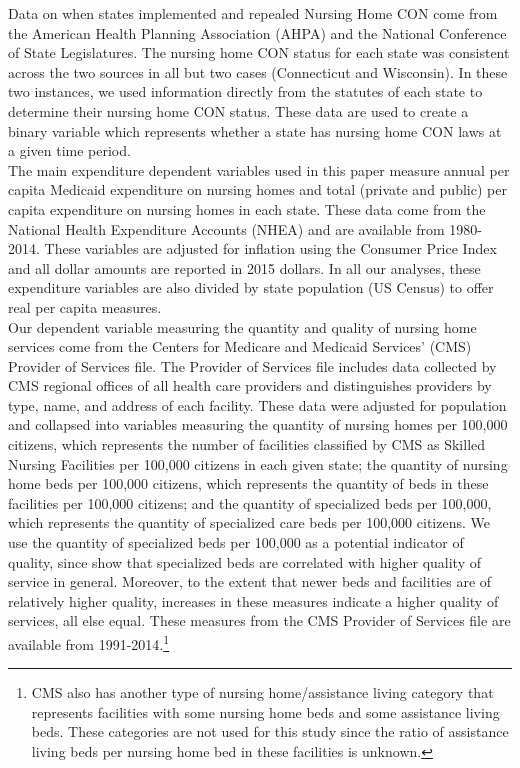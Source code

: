 \documentclass[../Main.tex]{subfiles}
\begin{document}
Data on when states implemented and repealed Nursing Home CON come from the American Health Planning Association (AHPA) and the National Conference of State Legislatures. The nursing home CON status for each state was consistent across the two sources in all but two cases (Connecticut and Wisconsin). In these two instances, we used information directly from the statutes of each state to determine their nursing home CON status. These data are used to create a binary variable which represents whether a state has nursing home CON laws at a given time period.\\
\indent The main expenditure dependent variables used in this paper measure annual per capita Medicaid expenditure on nursing homes and total (private and public) per capita expenditure on nursing homes in each state. These data come from the National Health Expenditure Accounts (NHEA) and are available from 1980-2014. These variables are adjusted for inflation using the Consumer Price Index and all dollar amounts are reported in 2015 dollars. In all our analyses, these expenditure variables are also divided by state population (US Census) to offer real per capita measures.\\
\indent Our dependent variable measuring the quantity and quality of nursing home services come from the Centers for Medicare and Medicaid Services’ (CMS) Provider of Services file. The Provider of Services file includes data collected by CMS regional offices of all health care providers and distinguishes providers by type, name, and address of each facility. These data were adjusted for population and collapsed into variables measuring the quantity of nursing homes per 100,000 citizens, which represents the number of facilities classified by CMS as Skilled Nursing Facilities per 100,000 citizens in each given state; the quantity of nursing home beds per 100,000 citizens, which represents the quantity of beds in these facilities per 100,000 citizens; and the quantity of specialized beds per 100,000, which represents the quantity of specialized care beds per 100,000 citizens. We use the quantity of specialized beds per 100,000 as a potential indicator of quality, since \citet{grabowski2010quality} show that specialized beds are correlated with higher quality of service in general. Moreover, to the extent that newer beds and facilities are of relatively higher quality, increases in these measures indicate a higher quality of services, all else equal. These measures from the CMS Provider of Services file are available from 1991-2014.\footnote{CMS also has another type of nursing home/assistance living category that represents facilities with some nursing home beds and some assistance living beds. These categories are not used for this study since the ratio of assistance living beds per nursing home bed in these facilities is unknown.} \\
\end{document}
